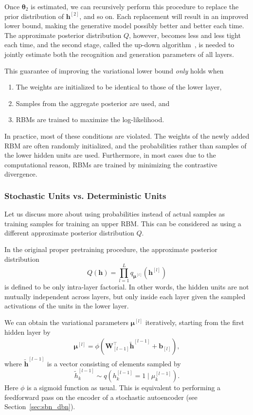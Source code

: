 \documentclass{now}
\newcommand{\qlay}[1]{\left[#1\right]}
\newcommand{\vect}[1]{\mathbf{#1}}
\newcommand{\vects}[1]{\boldsymbol{#1}}
\newcommand{\matr}[1]{\mathbf{#1}}
\newcommand{\vb}[0]{\vect{b}}
\newcommand{\vh}[0]{\vect{h}}
\newcommand{\mW}[0]{\matr{W}}
\newcommand{\vmu}[0]{\vects{\mu}}
\newcommand{\TT}[0]{{\vects{\theta}}}
\begin{document}
Once $\TT_2$ is estimated, we can recursively perform this procedure to replace
the prior distribution of $\vh^{\qlay{2}}$, and so on.  Each replacement will
result in an improved lower bound, making the generative model possibly better
and better each time.  The approximate posterior distribution $Q$, however,
becomes less and less tight each time, and the second stage, called the up-down
algorithm~\citep{Hinton2006nc}, is needed to jointly estimate both the
recognition and generation parameters of all layers.  

This guarantee of improving the variational lower bound
\textit{only} holds when
\begin{enumerate}
        \vspace{-5mm}
    \itemsep 0em
    \item The weights are initialized to be identical to those of the lower layer,
    \item Samples from the aggregate posterior are used, and
    \item RBMs are trained to maximize the log-likelihood.
\end{enumerate}

In practice, most of these conditions are violated. The weights of the newly
added RBM are often randomly initialized, and the probabilities rather than
samples of the lower hidden units are used. Furthermore, in most cases due to
the computational reason, RBMs are trained by minimizing the contrastive
divergence. 

\subsubsection{Stochastic Units vs. Deterministic Units}
\label{sec:det_vs_sto}

Let us discuss more about using probabilities instead of actual samples as
training samples for training an upper RBM. This can be considered as using a
different approximate posterior distribution $Q$.

In the original proper pretraining procedure, the approximate posterior
distribution
\[
Q(\vh) = \prod_{l=1}^L q_{\vmu^{\qlay{l}}}\left(
\vh^{\qlay{l}} \right)
\]
is defined to be only intra-layer factorial. In other words, the hidden units
are not mutually independent across layers, but only inside each layer given the
sampled activations of the units in the lower layer.

We can obtain the variational parameters $\vmu^{\qlay{l}}$ iteratively, starting
from the first hidden layer by
\begin{align}
    \label{eq:dbn_posterior}
    \vmu^{\qlay{l}} = \phi\left( \mW_{\qlay{l-1}}^\top
    \tilde{\vh}^{\qlay{l-1}} + \vb_{\qlay{l}} \right),
\end{align}
where $\tilde{\vh}^{\qlay{l-1}}$ is a vector consisting of elements sampled by 
\[
\tilde{h}_k^{\qlay{l-1}} \sim q\left(h_k^{\qlay{l-1}} = 1 \mid
\mu_k^{\qlay{l-1}}\right).
\]
Here $\phi$ is a sigmoid function as usual. This is equivalent to performing a
feedforward pass on the encoder of a stochastic autoencoder (see
Section~\ref{sec:sbn_dbn}).
\end{document}
